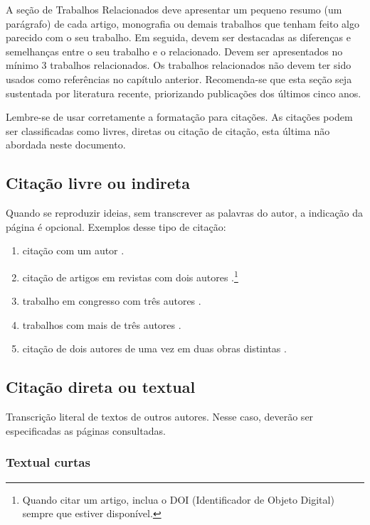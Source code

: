 A seção de Trabalhos Relacionados deve apresentar um pequeno resumo (um parágrafo) de cada artigo, monografia ou demais trabalhos que tenham feito algo parecido com o seu trabalho. Em seguida, devem ser destacadas as diferenças e semelhanças entre o seu trabalho e o relacionado. Devem ser apresentados no mínimo 3 trabalhos relacionados. Os trabalhos relacionados não devem ter sido usados como referências no capítulo anterior. Recomenda-se que esta seção seja sustentada por literatura recente, priorizando publicações dos últimos cinco anos.

Lembre-se de usar corretamente a formatação para citações. As citações podem ser classificadas como livres, diretas ou citação de citação, esta última não abordada neste documento.


\estrutura\subsection{\esp Citação livre ou indireta}\instrucao

Quando se reproduzir ideias, sem transcrever as palavras do autor, a indicação da página é opcional. Exemplos desse tipo de citação:
\begin{enumerate} 
 \item citação com um autor \cite{knuth1968}. 
 \item citação de artigos em revistas com dois autores \cite{prenner2022}.\footnote{Quando citar um artigo, inclua o DOI (Identificador de Objeto Digital) sempre que estiver disponível.}
  \item trabalho em congresso com três autores \cite{vasconcelos2016}.
 \item trabalhos com mais de três autores \cite{cap-livro2005}.
 \item citação de dois autores de uma vez em duas obras distintas \cite{gil2022,groupp2003}.
\end{enumerate}

\estrutura\subsection{\esp Citação direta ou textual}\instrucao

Transcrição literal de textos de outros autores. Nesse caso, deverão ser especificadas as páginas consultadas. 


\estrutura\subsubsection{\esp Textual curtas}\instrucao

